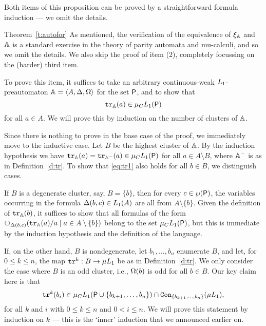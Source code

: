 Both items of this proposition can be proved by a straightforward formula 
induction --- we omit the details.


\begin{proofof}{Theorem~\ref{t:autofor}}
As mentioned, the verification of the equivalence of $\xi_{\mathbb{A}}$ and $\mathbb{A}$
is a standard exercise in the theory of parity automata and mu-calculi, and so
we omit the details.
We also skip the proof of item (2), completely focussing on the (harder) third 
item.

To prove this item, it suffices to take an arbitrary continuous-weak 
$L_{1}$-preautomaton $\mathbb{A} = \langle{A,\Delta,\Omega}\rangle$ for the set $\mathsf{P}$,
and to show that 
\begin{equation}
\label{eq:tr1}
\ytr_{\bbA}(a) \in \mu_{C}\oslang(\pprop)
\end{equation}
for all $a \in A$.
We will prove this by induction on the number of clusters of $\mathbb{A}$.

Since there is nothing to prove in the base case of the proof, we immediately
move to the inductive case.
Let $B$ be the highest cluster of $\mathbb{A}$.
By the induction hypothesis we have $\mathtt{tr}_{\mathbb{A}}(a) = \mathtt{tr}_{\mathbb{A}^{-}}(a) \in 
\mu_{C}L_{1}(\mathsf{P})$ for all $a \in A \setminus B$, where 
$\mathbb{A}^{-}$ is as in Definition~\ref{d:tr}.
To show that \eqref{eq:tr1} also holds for all $b \in B$, we distinguish cases.

If $B$ is a degenerate cluster, say, $B = \{ b \}$, then for every $c \in 
\wp(\mathsf{P})$, the variables occurring in the formula $\Delta(b,c) \in L_{1}(A)$
are all from $A \setminus \{ b \}$.
Given the definition of $\mathtt{tr}_{\mathbb{A}}(b)$, it suffices to show that all formulas 
of the form $\nxt{\tmap(b,c)}(\ytr_{\bbA}(a)/a \mid a \in A \setminus \{ b \})$
belong to the set $\mu_{C}L_{1}(\mathsf{P})$, but this is immediate by the 
induction hypothesis and the definition of the language.

If, on the other hand, $B$ is nondegenerate, let $b_{1},\ldots,b_{n}$ enumerate
$B$, and let, for $0\leq k \leq n$, the map $\mathtt{tr}^{k}: B \to \mu L_{1}$ be as in
Definition~\ref{d:tr}.
We only consider the case where $B$ is an odd cluster, i.e., $\Omega(b)$ is odd
for all $b \in B$.
Our key claim here is that 
\begin{equation}
\label{eq:tr2}
\ytr^{k}(b_{i}) \in \mu_{C}\oslang(\pprop \cup \{ b_{k+1},\ldots,b_{n}\}) \cap 
\cont{\mu\oslang}{\{ b_{k+1},\ldots,b_{n}\}},
\end{equation}
for all $k$ and $i$ with $0 \leq k \leq n$ and $0 < i \leq n$.
We will prove this statement by induction on $k$ --- this is the `inner' 
induction that we announced earlier on.


\end{proofof}
